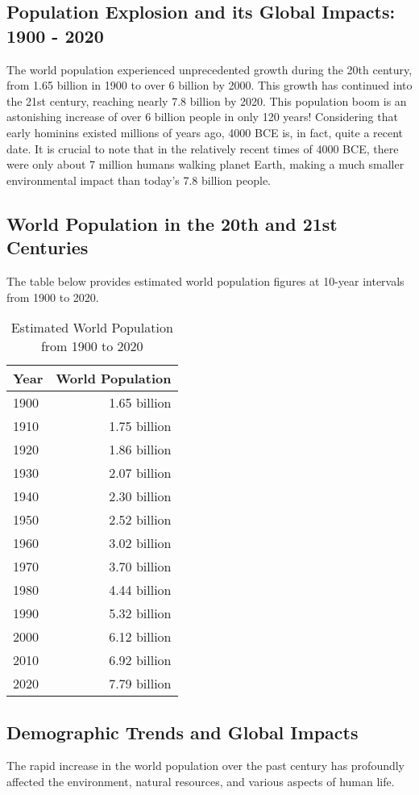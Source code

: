 \documentclass[a4paper,12pt]{book}
\begin{document}
\subsection*{Population Explosion and its Global Impacts: 1900 - 2020}
The world population experienced unprecedented growth during the 20th century, from 1.65 billion in 1900 to over 6 billion by 2000. This growth has continued into the 21st century, reaching nearly 7.8 billion by 2020. This population boom is an astonishing increase of over 6 billion people in only 120 years! Considering that early hominins existed millions of years ago, 4000 BCE is, in fact, quite a recent date. It is crucial to note that in the relatively recent times of 4000 BCE, there were only about 7 million humans walking planet Earth, making a much smaller environmental impact than today's 7.8 billion people.

\subsection*{World Population in the 20th and 21st Centuries}
The table below provides estimated world population figures at 10-year intervals from 1900 to 2020.

\begin{table}[h!]
\centering
\begin{tabular}{|l|r|}
\hline
Year & World Population \\
\hline
1900 & 1.65 billion \\
1910 & 1.75 billion \\
1920 & 1.86 billion \\
1930 & 2.07 billion \\
1940 & 2.30 billion \\
1950 & 2.52 billion \\
1960 & 3.02 billion \\
1970 & 3.70 billion \\
1980 & 4.44 billion \\
1990 & 5.32 billion \\
2000 & 6.12 billion \\
2010 & 6.92 billion \\
2020 & 7.79 billion \\
\hline
\end{tabular}
\caption{Estimated World Population from 1900 to 2020}
\label{tab:world_population_1900_2020}
\end{table}

\subsection*{Demographic Trends and Global Impacts}
The rapid increase in the world population over the past century has profoundly affected the environment, natural resources, and various aspects of human life.
\end{document}
